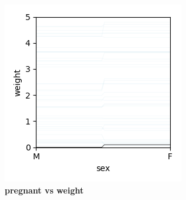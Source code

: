 \documentclass[12pt]{article}
\begin{document}
\begin{figure}[htbp]
\begin{center}
\includegraphics[scale=0.7]{images/sex_vs_weight_pdp.png}
\caption{{\bf  pregnant vs weight}}
\label{fig:pregnant_vs_weight}
\end{center}
\end{figure}
\end{document}
